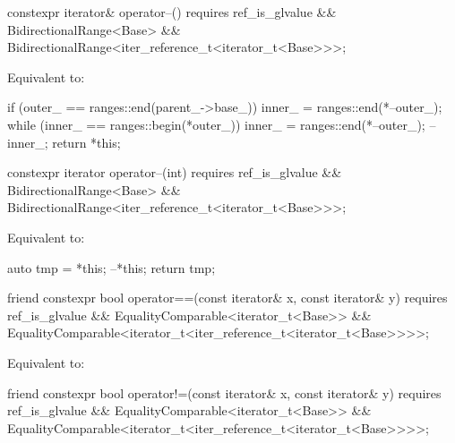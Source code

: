 \begin{itemdecl}
constexpr iterator& operator--()
  requires ref_is_glvalue && BidirectionalRange<Base> &&
           BidirectionalRange<iter_reference_t<iterator_t<Base>>>;
\end{itemdecl}

\begin{itemdescr}
\pnum
\effects Equivalent to:
\begin{codeblock}
if (outer_ == ranges::end(parent_->base_))
  inner_ = ranges::end(*--outer_);
while (inner_ == ranges::begin(*outer_))
  inner_ = ranges::end(*--outer_);
--inner_;
return *this;
\end{codeblock}
\end{itemdescr}

\begin{itemdecl}
constexpr iterator operator--(int)
  requires ref_is_glvalue && BidirectionalRange<Base> &&
           BidirectionalRange<iter_reference_t<iterator_t<Base>>>;
\end{itemdecl}

\begin{itemdescr}
\pnum
\effects Equivalent to:
\begin{codeblock}
auto tmp = *this;
--*this;
return tmp;
\end{codeblock}
\end{itemdescr}

\begin{itemdecl}
friend constexpr bool operator==(const iterator& x, const iterator& y)
  requires ref_is_glvalue && EqualityComparable<iterator_t<Base>> &&
           EqualityComparable<iterator_t<iter_reference_t<iterator_t<Base>>>>;
\end{itemdecl}

\begin{itemdescr}
\pnum
\effects Equivalent to:
\end{itemdescr}

\begin{itemdecl}
friend constexpr bool operator!=(const iterator& x, const iterator& y)
  requires ref_is_glvalue && EqualityComparable<iterator_t<Base>> &&
           EqualityComparable<iterator_t<iter_reference_t<iterator_t<Base>>>>;
\end{itemdecl}


